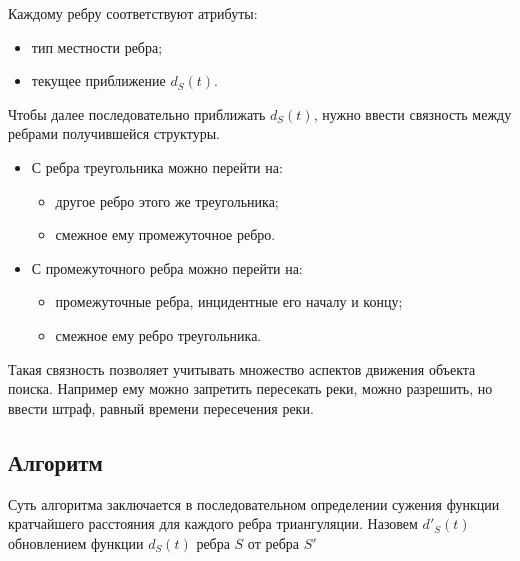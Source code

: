 Каждому ребру соответствуют атрибуты:
\begin{itemize}
\item тип местности ребра;
\item текущее приближение $d_S(t)$.
\end{itemize}

Чтобы далее последовательно приближать $d_S(t)$, нужно ввести связность между
ребрами получившейся структуры.
\begin{itemize}
\item С ребра треугольника можно перейти на:
  \begin{itemize}
  \item другое ребро этого же треугольника;
  \item смежное ему промежуточное ребро.
  \end{itemize}
\item С промежуточного ребра можно перейти на:
  \begin{itemize}
  \item промежуточные ребра, инцидентные его началу и концу;
  \item смежное ему ребро треугольника.
  \end{itemize}
\end{itemize}

Такая связность позволяет учитывать множество аспектов движения
объекта поиска. Например ему можно запретить пересекать реки,
можно разрешить, но ввести штраф, равный времени пересечения реки.

\subsection{Алгоритм}
Суть алгоритма заключается в последовательном определении сужения функции
кратчайшего расстояния для каждого ребра триангуляции.
Назовем $d'_S(t)$ обновлением функции $d_S(t)$ ребра $S$ от ребра $S'$
